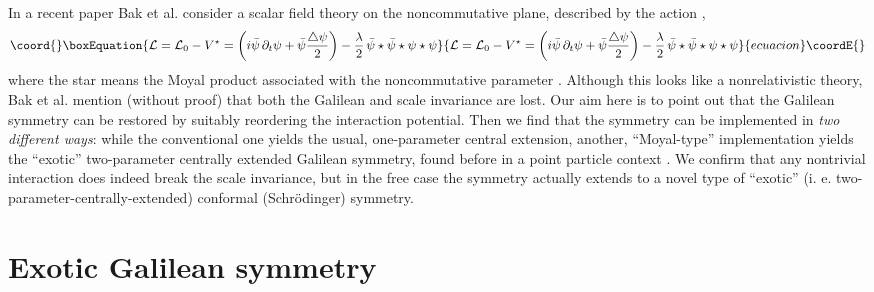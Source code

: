 \documentclass[a4paper,11pt]{article}
\let\ssection=\section
\renewcommand{\section}{\setcounter{equation}{0}\ssection}
\def\p{{\partial}}
\def\vx{{\vec x}}
\begin{document}
In a recent paper  \cite{Baketal}
Bak et al. consider a scalar field theory on
the noncommutative plane, described by the action
\myHighlight{$S=S_{0}+S_{int}^\star=\int\!d^2\vx dt{\cal L}$}\coordHE{},
\begin{equation}\coord{}\boxEquation{
     {\cal L}={\cal L}_{0}-V^\star
     =\left(i\bar{\psi}\,\p_{t}\psi+
     \bar{\psi}\frac{\bigtriangleup\psi}{2}\right)
     -\frac{\lambda}{2}\,
     \bar{\psi}\star\bar{\psi}\star\psi\star\psi
     \label{action}
}{
     {\cal L}={\cal L}_{0}-V^\star
     =\left(i\bar{\psi}\,\p_{t}\psi+
     \bar{\psi}\frac{\bigtriangleup\psi}{2}\right)
     -\frac{\lambda}{2}\,
     \bar{\psi}\star\bar{\psi}\star\psi\star\psi
     }{ecuacion}\coordE{}\end{equation}
where the star means the Moyal product associated with
the noncommutative parameter \myHighlight{$\theta$}\coordHE{}.  Although this looks
like a nonrelativistic theory, Bak et al. mention (without proof) that
both the Galilean and scale invariance are lost.
Our aim here is to point out that
the Galilean symmetry can be restored by suitably
reordering the interaction potential.
Then we find that the symmetry
can be implemented in {\it two different ways}:
while the conventional
one yields the usual, one-parameter central extension,
another, ``Moyal-type'' implementation yields the
``exotic'' two-parameter centrally extended
Galilean symmetry, found before in a point particle context \cite{LeLe}.
We confirm that any nontrivial interaction
does indeed break the scale invariance, but
in the free case the symmetry
actually extends to a novel type of ``exotic'' (i. e.
two-parameter-centrally-extended) conformal (Schr\"odinger)
symmetry.
\goodbreak

\section{Exotic Galilean symmetry}
\end{document}
